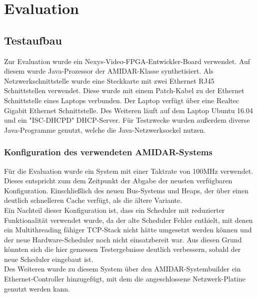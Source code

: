 \chapter{Evaluation}


\section{Testaufbau}

Zur Evaluation wurde ein Nexys-Video-FPGA-Entwickler-Board verwendet. Auf diesem wurde Java-Prozessor der AMIDAR-Klasse synthetisiert. Als Netzwerkschnittstelle wurde eine Steckkarte mit zwei Ethernet RJ45 Schnittstellen verwendet. Diese wurde mit einem Patch-Kabel zu der Ethernet Schnittstelle eines Laptops verbunden. Der Laptop verfügt über eine Realtec Gigabit Ethernet Schnittstelle. Des Weiteren läuft auf dem Laptop Ubuntu 16.04 und ein "{}ISC-DHCPD"{} DHCP-Server. Für Testzwecke wurden außerdem diverse Java-Programme genutzt, welche die Java-Netzwerksockel nutzen. 

\subsection{Konfiguration des verwendeten AMIDAR-Systems}
Für die Evaluation wurde ein System mit einer Taktrate von 100MHz verwendet. Dieses entspricht zum dem Zeitpunkt der Abgabe der neusten verfügbaren Konfiguration. Einschließlich des neuen Bus-Systems und Heaps, der über einen deutlich schnelleren Cache verfügt, als die ältere Variante. \\
Ein Nachteil dieser Konfiguration ist, dass ein Scheduler mit reduzierter Funktionalität verwendet wurde, da der alte Scheduler Fehler enthielt, mit denen ein Multithreading fähiger TCP-Stack nicht hätte umgesetzt werden können und der neue Hardware-Scheduler noch nicht einsatzbereit war. Aus diesen Grund könnten sich die hier gemessen Testergebnisse deutlich verbessern, sobald der neue Scheduler eingebaut ist. \\
Des Weiteren wurde zu diesem System über den AMIDAR-Systembuilder ein Ethernet-Controller hinzugefügt, mit dem die angeschlossene Netzwerk-Platine genutzt werden kann.



